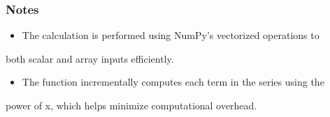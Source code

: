 \documentclass[a4paper,10pt,oneside,english]{sphinxmanual}
\begin{document}
\begin{fulllineitems}
\begin{sphinxVerbatim}[commandchars=\\\{\}]
\end{sphinxVerbatim}

\begin{sphinxVerbatim}[commandchars=\\\{\}]
\PYG{p}{[}  \PYG{p}{]}
\end{sphinxVerbatim}
\subsubsection*{Notes}
\begin{itemize}
\item {} 
\sphinxAtStartPar
The calculation is performed using NumPy’s vectorized operations to

\end{itemize}
\begin{description}
\sphinxAtStartPar
both scalar and array inputs efficiently.

\end{description}
\begin{itemize}
\item {} 
\sphinxAtStartPar
The function incrementally computes each term in the series using the

\end{itemize}
\begin{description}
\sphinxAtStartPar
power of x, which helps minimize computational overhead.

\end{description}

\end{fulllineitems}

\end{document}
